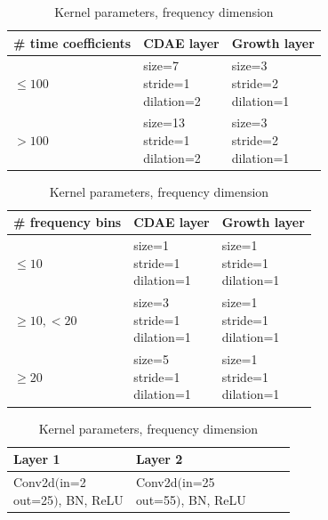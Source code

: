 \documentclass[report.tex]{subfiles}
\begin{document}
\begin{table}[ht]
	\centering
	\begin{tabular}{ |l|l|l| }
	 \hline
		\# time coefficients & CDAE layer & Growth layer \\
	 \hline
	 \hline
		$\le 100$ & \makecell[l]{size=7\\stride=1\\dilation=2} & \makecell[l]{size=3\\stride=2\\dilation=1} \\
	 \hline
		$> 100$ & \makecell[l]{size=13\\stride=1\\dilation=2} & \makecell[l]{size=3\\stride=2\\dilation=1} \\
	 \hline
\end{tabular}
	\caption{Kernel parameters, time dimension}
	\label{table:convtable1}
	\vspace{1em}
\begin{tabular}{ |l|l|l| }
	 \hline
		\# frequency bins & CDAE layer & Growth layer \\
	 \hline
	 \hline
		$\le 10$ & \makecell[l]{size=1\\stride=1\\dilation=1} & \makecell[l]{size=1\\stride=1\\dilation=1} \\
	 \hline
		$\ge 10, < 20$ & \makecell[l]{size=3\\stride=1\\dilation=1} & \makecell[l]{size=1\\stride=1\\dilation=1} \\
	 \hline
		$\ge 20$ & \makecell[l]{size=5\\stride=1\\dilation=1} & \makecell[l]{size=1\\stride=1\\dilation=1} \\
	 \hline
\end{tabular}
	\caption{Kernel parameters, frequency dimension}
	\label{table:convtable2}
	\vspace{1em}
\begin{tabular}{ |l|l|l|l|l| }
	 \hline
		Layer 1 & Layer 2 \\
	 \hline
	 \hline
		Conv2d$\Big($\makecell[l]{in=2\\out=25}$\Big)$, BN, ReLU & Conv2d$\Big($\makecell[l]{in=25\\out=55}$\Big)$, BN, ReLU \\

\end{tabular}
\end{table}
\end{document}
